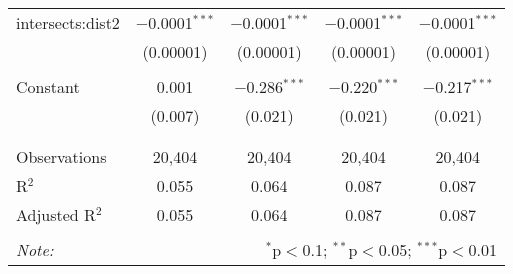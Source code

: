 \begin{table}[!htbp]
\begin{tabular}{@{\extracolsep{-5pt}}lcccc}
 intersects:dist2 & $-$0.0001$^{***}$ & $-$0.0001$^{***}$ & $-$0.0001$^{***}$ & $-$0.0001$^{***}$ \\ 
  & (0.00001) & (0.00001) & (0.00001) & (0.00001) \\ 
  & & & & \\ 
 Constant & 0.001 & $-$0.286$^{***}$ & $-$0.220$^{***}$ & $-$0.217$^{***}$ \\ 
  & (0.007) & (0.021) & (0.021) & (0.021) \\ 
  & & & & \\ 
\hline \\[-1.8ex] 
Observations & 20,404 & 20,404 & 20,404 & 20,404 \\ 
R$^{2}$ & 0.055 & 0.064 & 0.087 & 0.087 \\ 
Adjusted R$^{2}$ & 0.055 & 0.064 & 0.087 & 0.087 \\ 
\hline 
\hline \\[-1.8ex] 
\textit{Note:}  & \multicolumn{4}{r}{$^{*}$p$<$0.1; $^{**}$p$<$0.05; $^{***}$p$<$0.01} \\ 
\end{tabular} 
\end{table} 
